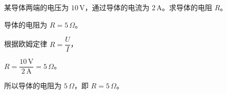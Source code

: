
\begin{problem}
某导体两端的电压为 $10\,\mathrm{V}$，通过导体的电流为 $2\,\mathrm{A}$。求导体的电阻 $R$。
\end{problem}

\begin{answer}
导体的电阻为 $R=5\,\Omega$。
\end{answer}

\begin{solutions}
根据欧姆定律 $R=\dfrac{U}{I}$，

$R=\dfrac{10\,\mathrm{V}}{2\,\mathrm{A}}=5\,\Omega$。

所以导体的电阻为 $5\,\Omega$，即 $R=5\,\Omega$。
\end{solutions}
